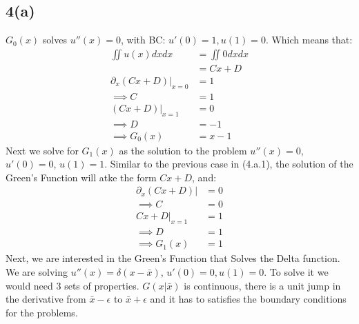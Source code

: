 \documentclass[]{article}
\begin{document}
    \subsection*{4(a)}
        $G_0(x)$ solves $u''(x) = 0$, with BC: $u'(0) = 1, u(1) = 0$. Which means that: 
        \begin{align*}\tag{4.a.1}\label{eqn:4.a.1}
            \iint u(x)dxdx &=\iint 0 dxdx
            \\
            & = Cx + D 
            \\
            \left.\partial_x(Cx + D)\right|_{x = 0} &= 1
            \\
            \implies C &= 1
            \\
            \left.(Cx + D)\right|_{x =1} &= 0
            \\
            \implies D &= -1 
            \\
            \implies G_0(x) &= x - 1
        \end{align*}
        Next we solve for $G_1(x)$ as the solution to the problem $u''(x) = 0$, $u'(0) = 0$, $u(1) = 1$. Similar to the previous case in (4.a.1), the solution of the Green's Function will atke the form $Cx + D$, and: 
        \begin{align*}\tag{4.a.2}\label{eqn:4.a.2}
            \left.\partial_x (Cx + D)\right| &= 0
            \\
            \implies C &= 0
            \\
            \left. 
                Cx + D     
            \right|_{x = 1} &= 1
            \\
            \implies D &= 1
            \\
            \implies G_1(x) &= 1
        \end{align*}
        Next, we are interested in the Green's Function that Solves the Delta function. We are solving $u''(x) = \delta(x - \bar{x})$, $u'(0) = 0, u(1) = 0$. To solve it we would need 3 sets of properties. $G(x|\bar{x})$ is continuous, there is a unit jump in the derivative from $\bar{x} - \epsilon$ to $\bar{x} + \epsilon$ and it has to satisfies the boundary conditions for the problems. 
\end{document}
